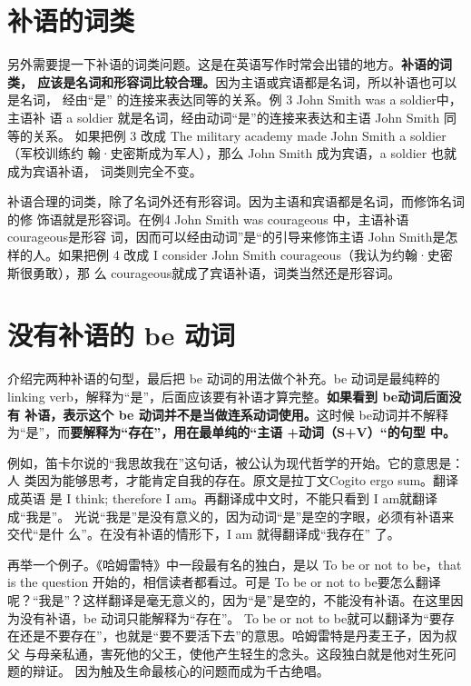 \section{补语的词类}

另外需要提一下补语的词类问题。这是在英语写作时常会出错的地方。\textbf{补语的词类，
  应该是名词和形容词比较合理。}因为主语或宾语都是名词，所以补语也可以是名词，
经由“是” 的连接来表达同等的关系。例 3 John Smith was a soldier中，主语补
语 a soldier 就是名词，经由动词“是”的连接来表达和主语 John Smith 同等的关系。
如果把例 3 改成 The military academy made John Smith a soldier（军校训练约
翰·史密斯成为军人），那么 John Smith 成为宾语，a soldier 也就成为宾语补语，
词类则完全不变。

补语合理的词类，除了名词外还有形容词。因为主语和宾语都是名词，而修饰名词的修
饰语就是形容词。在例4 John Smith was courageous 中，主语补语 courageous是形容
词，因而可以经由动词”是“的引导来修饰主语 John Smith是怎样的人。如果把例 4
改成 I consider John Smith courageous（我认为约翰·史密斯很勇敢），那
么 courageous就成了宾语补语，词类当然还是形容词。

\section{没有补语的 be 动词}

介绍完两种补语的句型，最后把 be 动词的用法做个补充。be 动词是最纯粹的linking
verb，解释为“是”，后面应该要有补语才算完整。\textbf{如果看到 be动词后面没有
  补语，表示这个 be 动词并不是当做连系动词使用。}这时候 be动词并不解释
为“是”，而\textbf{要解释为“存在”，用在最单纯的“主语 +动词（S+V）“的句型
  中。}

例如，笛卡尔说的“我思故我在”这句话，被公认为现代哲学的开始。它的意思是：人
类因为能够思考，才能肯定自我的存在。原文是拉丁文Cogito ergo sum。翻译成英语
是 I think; therefore I am。再翻译成中文时，不能只看到 I am就翻译成“我是”。
光说“我是”是没有意义的，因为动词“是”是空的字眼，必须有补语来交代“是什
么”。在没有补语的情形下，I am 就得翻译成“我存在” 了。

再举一个例子。《哈姆雷特》中一段最有名的独白，是以 To be or not to be，that
is the question 开始的，相信读者都看过。可是 To be or not to be要怎么翻译
呢？“我是”？这样翻译是毫无意义的，因为“是”是空的，不能没有补语。在这里因
为没有补语，be 动词只能解释为“存在”。 To be or not to be就可以翻译为“要存
在还是不要存在”，也就是“要不要活下去”的意思。哈姆雷特是丹麦王子，因为叔父
与母亲私通，害死他的父王，使他产生轻生的念头。这段独白就是他对生死问题的辩证。
因为触及生命最核心的问题而成为千古绝唱。


